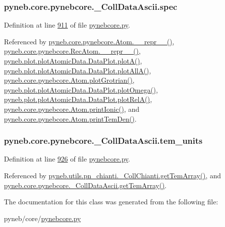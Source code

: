 \subsubsection[{spec}]{\setlength{\rightskip}{0pt plus 5cm}pyneb.\+core.\+pynebcore.\+\_\+\+Coll\+Data\+Ascii.\+spec}\label{classpyneb_1_1core_1_1pynebcore_1_1___coll_data_ascii_a75f41e91e7eb224162912bedac22b342}


Definition at line \hyperlink{pynebcore_8py_source_l00911}{911} of file \hyperlink{pynebcore_8py_source}{pynebcore.\+py}.



Referenced by \hyperlink{pynebcore_8py_source_l02544}{pyneb.\+core.\+pynebcore.\+Atom.\+\_\+\+\_\+repr\+\_\+\+\_\+()}, \hyperlink{pynebcore_8py_source_l03032}{pyneb.\+core.\+pynebcore.\+Rec\+Atom.\+\_\+\+\_\+repr\+\_\+\+\_\+()}, \hyperlink{plot_atomic_data_8py_source_l00116}{pyneb.\+plot.\+plot\+Atomic\+Data.\+Data\+Plot.\+plot\+A()}, \hyperlink{plot_atomic_data_8py_source_l00188}{pyneb.\+plot.\+plot\+Atomic\+Data.\+Data\+Plot.\+plot\+All\+A()}, \hyperlink{pynebcore_8py_source_l02372}{pyneb.\+core.\+pynebcore.\+Atom.\+plot\+Grotrian()}, \hyperlink{plot_atomic_data_8py_source_l00372}{pyneb.\+plot.\+plot\+Atomic\+Data.\+Data\+Plot.\+plot\+Omega()}, \hyperlink{plot_atomic_data_8py_source_l00261}{pyneb.\+plot.\+plot\+Atomic\+Data.\+Data\+Plot.\+plot\+Rel\+A()}, \hyperlink{pynebcore_8py_source_l02167}{pyneb.\+core.\+pynebcore.\+Atom.\+print\+Ionic()}, and \hyperlink{pynebcore_8py_source_l02253}{pyneb.\+core.\+pynebcore.\+Atom.\+print\+Tem\+Den()}.

\hypertarget{classpyneb_1_1core_1_1pynebcore_1_1___coll_data_ascii_ad026d62c0262a257b38f70a1d7b88c9b}{}
\subsubsection[{tem\+\_\+units}]{\setlength{\rightskip}{0pt plus 5cm}pyneb.\+core.\+pynebcore.\+\_\+\+Coll\+Data\+Ascii.\+tem\+\_\+units}\label{classpyneb_1_1core_1_1pynebcore_1_1___coll_data_ascii_ad026d62c0262a257b38f70a1d7b88c9b}


Definition at line \hyperlink{pynebcore_8py_source_l00926}{926} of file \hyperlink{pynebcore_8py_source}{pynebcore.\+py}.



Referenced by \hyperlink{pn__chianti_8py_source_l00521}{pyneb.\+utils.\+pn\+\_\+chianti.\+\_\+\+Coll\+Chianti.\+get\+Tem\+Array()}, and \hyperlink{pynebcore_8py_source_l01110}{pyneb.\+core.\+pynebcore.\+\_\+\+Coll\+Data\+Ascii.\+get\+Tem\+Array()}.



The documentation for this class was generated from the following file\+:\begin{DoxyCompactItemize}
\item 
pyneb/core/\hyperlink{pynebcore_8py}{pynebcore.\+py}\end{DoxyCompactItemize}
